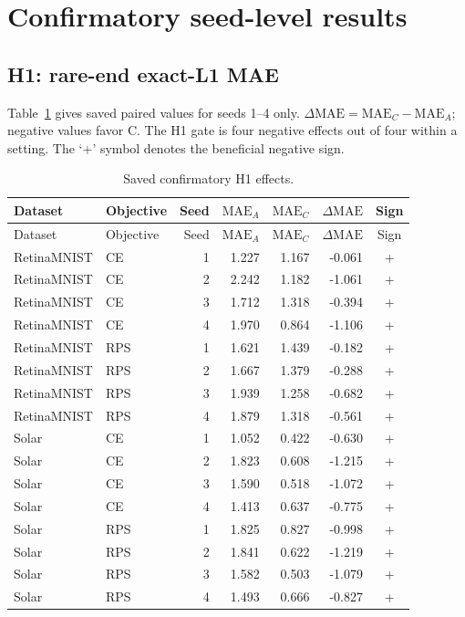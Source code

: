 \section{Confirmatory seed-level results}

\subsection{H1: rare-end exact-L1 MAE}

Table~\ref{tab:supp-h1} gives saved paired values for seeds 1--4 only.
\(\Delta\mathrm{MAE}=\mathrm{MAE}_C-\mathrm{MAE}_A\); negative values favor
C. The H1 gate is four negative effects out of four within a setting. The `+'
symbol denotes the beneficial negative sign.

\begin{longtable}{llrrrrc}
\caption{Saved confirmatory H1 effects.}\label{tab:supp-h1}\\
\toprule
Dataset & Objective & Seed & $\mathrm{MAE}_A$ & $\mathrm{MAE}_C$ & $\Delta\mathrm{MAE}$ & Sign \\
\midrule
\endfirsthead
\toprule
Dataset & Objective & Seed & $\mathrm{MAE}_A$ & $\mathrm{MAE}_C$ & $\Delta\mathrm{MAE}$ & Sign \\
\midrule
\endhead
RetinaMNIST & CE & 1 & 1.227 & 1.167 & -0.061 & + \\
RetinaMNIST & CE & 2 & 2.242 & 1.182 & -1.061 & + \\
RetinaMNIST & CE & 3 & 1.712 & 1.318 & -0.394 & + \\
RetinaMNIST & CE & 4 & 1.970 & 0.864 & -1.106 & + \\
RetinaMNIST & RPS & 1 & 1.621 & 1.439 & -0.182 & + \\
RetinaMNIST & RPS & 2 & 1.667 & 1.379 & -0.288 & + \\
RetinaMNIST & RPS & 3 & 1.939 & 1.258 & -0.682 & + \\
RetinaMNIST & RPS & 4 & 1.879 & 1.318 & -0.561 & + \\
Solar & CE & 1 & 1.052 & 0.422 & -0.630 & + \\
Solar & CE & 2 & 1.823 & 0.608 & -1.215 & + \\
Solar & CE & 3 & 1.590 & 0.518 & -1.072 & + \\
Solar & CE & 4 & 1.413 & 0.637 & -0.775 & + \\
Solar & RPS & 1 & 1.825 & 0.827 & -0.998 & + \\
Solar & RPS & 2 & 1.841 & 0.622 & -1.219 & + \\
Solar & RPS & 3 & 1.582 & 0.503 & -1.079 & + \\
Solar & RPS & 4 & 1.493 & 0.666 & -0.827 & + \\
\bottomrule
\end{longtable}

